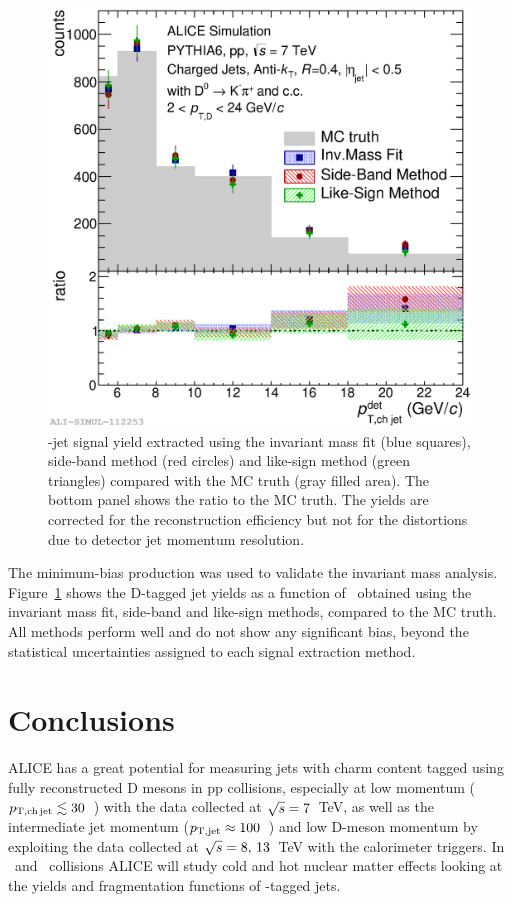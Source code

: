 \documentclass[a4paper]{jpconf}
\begin{document}
\begin{figure}[tb]
\includegraphics[width=.50\textwidth]{img/HQ16_Simulation_MethodComparison}\hspace{1pc}%
\begin{minipage}[b]{.50\textwidth}\caption{\label{fig:HQ16_Simulation_MethodComparison}\Dzero-jet signal yield extracted using the invariant mass fit (blue squares), side-band method (red circles) and like-sign method (green triangles)
compared with the MC truth (gray filled area). The bottom panel shows the ratio to the MC truth. The yields are corrected for the reconstruction efficiency but not for the distortions due to detector jet momentum resolution.}
\end{minipage}
\end{figure}

The minimum-bias production was used to validate the invariant mass analysis. 
Figure~\ref{fig:HQ16_Simulation_MethodComparison} shows the D-tagged jet yields as a function of \ptchjetdet\ obtained using the invariant mass fit, 
side-band and like-sign methods, compared to the MC truth. All methods perform well and do not show any significant bias, beyond the statistical uncertainties assigned to each signal extraction method.

\section{Conclusions}
ALICE has a great potential for measuring jets with charm content tagged using fully reconstructed D mesons in pp collisions, 
especially at low momentum ($p_{\mathrm{T,ch\, jet}} \lesssim 30$~\GeVc) with the data collected at $\sqrt{s}=7$~TeV,
as well as the intermediate jet momentum ($p_{\mathrm{T,jet}}\approx100$~\GeVc) and
low D-meson momentum by exploiting the data collected at $\sqrt{s}=8,\,13$~TeV with the calorimeter triggers.
In \PbPb\ and \pPb\ collisions ALICE will study cold and hot nuclear matter effects
looking at the yields and fragmentation functions of \Dzero-tagged jets.
\end{document}
